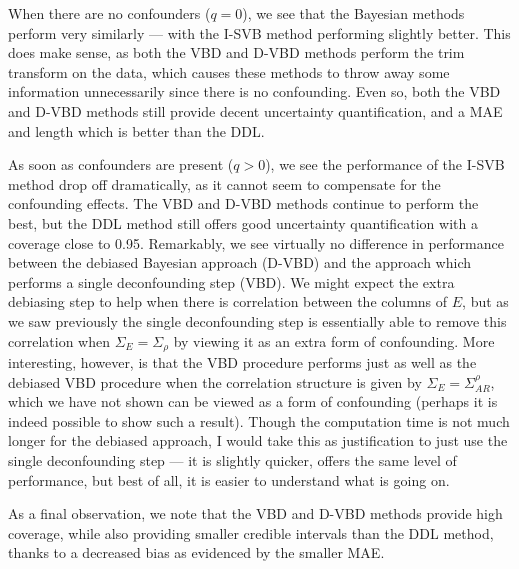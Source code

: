 \documentclass[11pt]{article}
\numberwithin{equation}{section}
\begin{document}
When there are no confounders ($q = 0$), we see that the Bayesian methods perform very similarly --- with the I-SVB method performing slightly better. This does make sense, as both the VBD and D-VBD methods perform the trim transform on the data, which causes these methods to throw away some information unnecessarily since there is no confounding. Even so, both the VBD and D-VBD methods still provide decent uncertainty quantification, and a MAE and length which is better than the DDL.

As soon as confounders are present ($q > 0$), we see the performance of the I-SVB method drop off dramatically, as it cannot seem to compensate for the confounding effects. The VBD and D-VBD methods continue to perform the best, but the DDL method still offers good uncertainty quantification with a coverage close to 0.95. Remarkably, we see virtually no difference in performance between the debiased Bayesian approach (D-VBD) and the approach which performs a single deconfounding step (VBD). We might expect the extra debiasing step to help when there is correlation between the columns of $E$, but as we saw previously the single deconfounding step is essentially able to remove this correlation when $\Sigma_E = \Sigma_\rho$ by viewing it as an extra form of confounding. More interesting, however, is that the VBD procedure performs just as well as the debiased VBD procedure when the correlation structure is given by $\Sigma_E = \Sigma_{AR}^\rho$, which we have not shown can be viewed as a form of confounding (perhaps it is indeed possible to show such a result). Though the computation time is not much longer for the debiased approach, I would take this as justification to just use the single deconfounding step --- it is slightly quicker, offers the same level of performance, but best of all, it is easier to understand what is going on.

As a final observation, we note that the VBD and D-VBD methods provide high coverage, while also providing smaller credible intervals than the DDL method, thanks to a decreased bias as evidenced by the smaller MAE.
\end{document}
